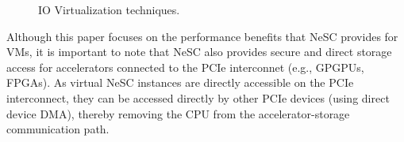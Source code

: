 \begin{figure}[!ht]
  \centering
    \hfill
    \hfill
    \caption{IO Virtualization techniques.
      \label{fig:storage}}
    
\end{figure}


Although this paper focuses on the performance benefits that NeSC provides for VMs, it is important to note that NeSC also provides secure and direct storage access for accelerators connected to the PCIe interconnet (e.g., GPGPUs, FPGAs). As virtual NeSC instances are directly accessible on the PCIe interconnect, they can be accessed directly by other PCIe devices (using direct device DMA), thereby removing the CPU from the accelerator-storage communication path.

